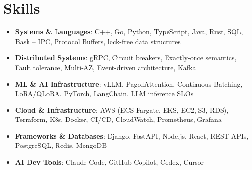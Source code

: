 \documentclass[letterpaper,11pt]{article}
\newcommand{\resumeSubHeadingListStart}{\begin{itemize}[leftmargin=0.15in, label={}]}
\newcommand{\resumeSubHeadingListEnd}{\end{itemize}}
\newcommand{\resumeSkillHeading}[2]{%
  \item\small{\textbf{#1}: #2 \vspace{-9pt}}%
}
\begin{document}
\section{Skills}
  \resumeSubHeadingListStart
    \resumeSkillHeading{Systems \& Languages}{C++, Go, Python, TypeScript, Java, Rust, SQL, Bash -- IPC, Protocol Buffers, lock-free data structures}
    \resumeSkillHeading{Distributed Systems}{gRPC, Circuit breakers, Exactly-once semantics, Fault tolerance, Multi-AZ, Event-driven architecture, Kafka}
    \resumeSkillHeading{ML \& AI Infrastructure}{vLLM, PagedAttention, Continuous Batching, LoRA/QLoRA, PyTorch, LangChain, LLM inference SLOs}
    \resumeSkillHeading{Cloud \& Infrastructure}{AWS (ECS Fargate, EKS, EC2, S3, RDS), Terraform, K8s, Docker, CI/CD, CloudWatch, Prometheus, Grafana}
    \resumeSkillHeading{Frameworks \& Databases}{Django, FastAPI, Node.js, React, REST APIs, PostgreSQL, Redis, MongoDB}
    \resumeSkillHeading{AI Dev Tools}{Claude Code, GitHub Copilot, Codex, Cursor}
  \resumeSubHeadingListEnd
\end{document}
